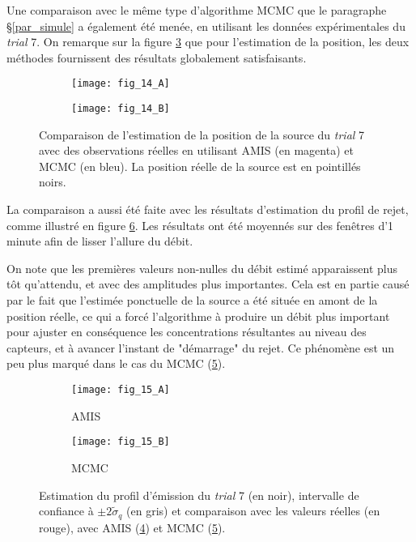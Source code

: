 Une comparaison avec le même type d'algorithme MCMC que le paragraphe §\ref{par_simule} a également été menée, en utilisant les données expérimentales du \textit{trial} 7. On remarque sur la figure \ref{fig_14_AE} que pour l'estimation de la position, les deux méthodes fournissent des résultats globalement satisfaisants. \\

\begin{figure}[h!]
	\centering
	\begin{subfigure}[t]{0.5\textwidth}
		\centering
		\texttt{[image: fig\_14\_A]}
		\caption{}
		\label{fig_14_A}
	\end{subfigure}%
	\centering
	\begin{subfigure}[t]{0.5\textwidth}
		\centering
		\texttt{[image: fig\_14\_B]}
		\caption{}
		\label{fig_14_B}
	\end{subfigure}
	\caption{Comparaison de l'estimation de la position de la source du \textit{trial} 7 avec des observations réelles en utilisant AMIS (en magenta) et MCMC (en bleu). La position réelle de la source est en pointillés noirs.}
	\label{fig_14_AE} 
\end{figure}

La comparaison a aussi été faite avec les résultats d'estimation du profil de rejet, comme illustré en figure \ref{fig_15_AE}. Les résultats ont été moyennés sur des fenêtres d'1 minute afin de lisser l'allure du débit.

 On note que les premières valeurs non-nulles du débit estimé apparaissent plus tôt qu'attendu, et avec des amplitudes plus importantes. Cela est en partie causé par le fait que l'estimée ponctuelle de la source a été située  en amont de la position réelle, ce qui a forcé l'algorithme à produire un débit plus important pour ajuster en conséquence les concentrations résultantes au niveau des capteurs, et à avancer l'instant de "démarrage" du rejet. Ce phénomène est un peu plus marqué dans le cas du MCMC (\ref{fig_15_B}).

\begin{figure}[h!]
	\centering
	\begin{subfigure}[t]{0.5\textwidth}
		\centering
		\texttt{[image: fig\_15\_A]}
		\caption{AMIS}
		\label{fig_15_A}
	\end{subfigure}%
	\centering
	\begin{subfigure}[t]{0.5\textwidth}
		\centering
		\texttt{[image: fig\_15\_B]}
		\caption{MCMC}
		\label{fig_15_B}
	\end{subfigure}
	\caption{Estimation du profil d'émission du \textit{trial} 7 (en noir), intervalle de confiance à $\pm 2\widetilde{\sigma}_q$ (en gris) et comparaison avec les valeurs réelles (en rouge), avec AMIS (\ref{fig_15_A}) et MCMC (\ref{fig_15_B}).}
	\label{fig_15_AE} 
\end{figure}

